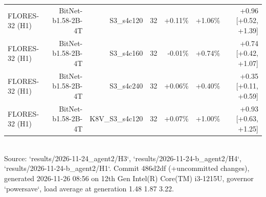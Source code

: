 \begin{table}[t]
\begin{tabular}{lrrrrrr}
FLORES-32 (H1) & BitNet-b1.58-2B-4T & S3\_s4c120 & 32 & +0.11\% & +1.06\% & +0.96 [+0.52, +1.39] \\
FLORES-32 (H1) & BitNet-b1.58-2B-4T & S3\_s4c160 & 32 & -0.01\% & +0.74\% & +0.74 [+0.42, +1.07] \\
FLORES-32 (H1) & BitNet-b1.58-2B-4T & S3\_s4c240 & 32 & +0.06\% & +0.40\% & +0.35 [+0.11, +0.59] \\
FLORES-32 (H1) & BitNet-b1.58-2B-4T & K8V\_S3\_s4c120 & 32 & +0.07\% & +1.00\% & +0.93 [+0.63, +1.25] \\
\bottomrule\end{tabular}
\\[2pt]{\scriptsize Source: `results/2026-11-24\_agent2/H3`, `results/2026-11-24-b\_agent2/H4`, `results/2026-11-24-b\_agent2/H1`. Commit 486d2df (+uncommitted changes), generated 2026-11-26 08:56 on 12th Gen Intel(R) Core(TM) i3-1215U, governor `powersave`, load average at generation 1.48 1.87 3.22.}
\end{table}

